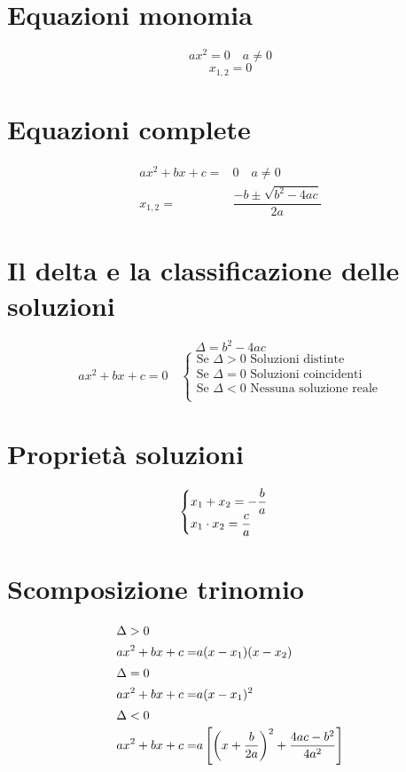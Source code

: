 \section{Equazioni monomia}
\begin{equation*}
ax^2=0\quad a\neq 0
\end{equation*}
\begin{equation*}
x_{1,2}=0
\end{equation*}
\section{Equazioni complete}
\begin{align*}
ax^2+bx+c=&0\quad a\neq 0\\
x_{1,2}=&\dfrac{-b\pm\sqrt{b^2-4ac}}{2a}
\end{align*}
\section{Il delta e la classificazione delle soluzioni}
\begin{equation*}
\Delta=b^2-4ac
\end{equation*}
\begin{equation*}
ax^2+bx+c=0\quad\begin{cases}
\text{Se $\Delta >0$ Soluzioni distinte}\\
\text{Se $\Delta =0$ Soluzioni coincidenti}\\
\text{Se $\Delta <0$ Nessuna soluzione reale}\\
\end{cases}
\end{equation*}
\section{Proprietà soluzioni}
\begin{equation*}
\begin{cases}
x_1+x_2=-\dfrac{b}{a}\\
x_1\cdot x_2=\dfrac{c}{a}
\end{cases}\index{Equazione!secondo grado!somma soluzioni}\index{Equazione!secondo grado!prodotto soluzioni}
\end{equation*}
\section{Scomposizione trinomio}
\begin{align*}
\intertext{$\Delta>0$}
ax^2+bx+c=&a(x-x_1)(x-x_2)\\
\intertext{$\Delta=0$}
ax^2+bx+c=&a(x-x_1)^2\\
\intertext{$\Delta<0$}
ax^2+bx+c=&a\left[\left(x+\dfrac{b}{2a}\right)^2+\dfrac{4ac-b^2}{4a^2}\right]
\end{align*}
